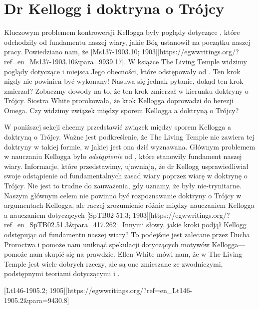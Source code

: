 \chapter{Dr Kellogg i doktryna o Trójcy}

Kluczowym problemem kontrowersji  Kellogga były poglądy dotyczące , które odchodziły od fundamentu naszej wiary, jakie Bóg ustanowił na początku naszej pracy. Powiedziano nam, że [Ms137-1903.10; 1903][https://egwwritings.org/?ref=en\_Ms137-1903.10&para=9939.17]. W książce The Living Temple widzimy poglądy dotyczące  i miejsca Jego obecności, które odstępowały od . Ten krok nigdy nie powinien być wykonany! Nasuwa się jednak pytanie, dokąd ten krok zmierzał? Zobaczmy dowody na to, że ten krok zmierzał w kierunku doktryny o Trójcy. Siostra White prorokowała, że krok Kellogga doprowadzi do herezji Omega. Czy widzimy związek między sporem Kellogga a doktryną o Trójcy?

W poniższej sekcji chcemy przedstawić związek między sporem Kellogga a doktryną o Trójcy. Ważne jest podkreślenie, że The Living Temple nie zawiera tej doktryny w takiej formie, w jakiej jest ona dziś wyznawana. Głównym problemem w nauczaniu Kellogga było \textit{odstąpienie} od , które stanowiły fundament naszej wiary. Informacje, które przedstawimy, ujawniają, że dr Kellogg usprawiedliwiał swoje odstąpienie od fundamentalnych zasad wiary poprzez wiarę w doktrynę o Trójcy. Nie jest to trudne do zauważenia, gdy uznamy, że  były nie-trynitarne. Naszym głównym celem nie powinno być rozpoznawanie doktryny o Trójcy w argumentach Kellogga, ale raczej zrozumienie różnic między nauczaniem Kellogga a nauczaniem  dotyczących [SpTB02 51.3; 1903][https://egwwritings.org/?ref=en\_SpTB02.51.3&para=417.262]. Innymi słowy, jakie kroki podjął Kellogg odstępując od fundamentu naszej wiary? To podejście jest zalecane przez Ducha Proroctwa i pomoże nam uniknąć spekulacji dotyczących motywów Kellogga—pomoże nam skupić się na prawdzie. Ellen White mówi nam, że w The Living Temple jest wiele dobrych rzeczy, ale są one zmieszane ze zwodniczymi, podstępnymi teoriami dotyczącymi  i .

[Lt146-1905.2; 1905][https://egwwritings.org/?ref=en\_Lt146-1905.2&para=9430.8]

